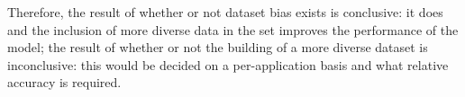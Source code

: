 \documentclass[conference]{IEEEtran}
\begin{document}
Therefore, the result of whether or not dataset bias exists is conclusive: it does and the inclusion of more diverse data in the set improves the performance of the model; the result of whether or not the building of a more diverse dataset is inconclusive: this would be decided on a per-application basis and what relative accuracy is required.

\medskip
 




\end{document}

